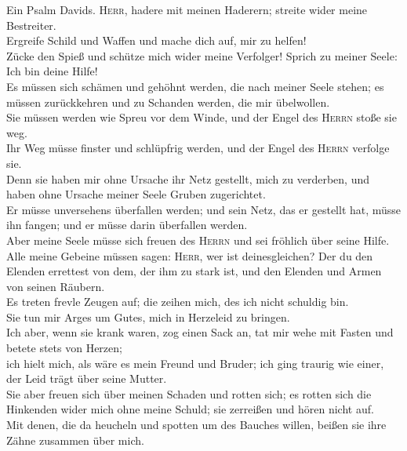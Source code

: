  Ein Psalm Davids. \textsc{Herr}, hadere mit meinen
Haderern; streite wider meine Bestreiter.\\
 Ergreife Schild und Waffen und mache dich auf, mir zu
helfen!\\
 Zücke den Spieß und schütze mich wider meine Verfolger!
Sprich zu meiner Seele: Ich bin deine Hilfe!\\
 Es müssen sich schämen und gehöhnt werden, die nach
meiner Seele stehen; es müssen zurückkehren und zu Schanden werden, die
mir übelwollen.\\
 Sie müssen werden wie Spreu vor dem Winde, und der Engel
des \textsc{Herrn} stoße sie weg.\\
 Ihr Weg müsse finster und schlüpfrig werden, und der
Engel des \textsc{Herrn} verfolge sie.\\
 Denn sie haben mir ohne Ursache ihr Netz gestellt, mich
zu verderben, und haben ohne Ursache meiner Seele Gruben zugerichtet.\\
 Er müsse unversehens überfallen werden; und sein Netz,
das er gestellt hat, müsse ihn fangen; und er müsse darin überfallen
werden.\\
 Aber meine Seele müsse sich freuen des \textsc{Herrn} und
sei fröhlich über seine Hilfe.\\
 Alle meine Gebeine müssen sagen: \textsc{Herr}, wer ist
deinesgleichen? Der du den Elenden errettest von dem, der ihm zu stark
ist, und den Elenden und Armen von seinen Räubern.\\
 Es treten frevle Zeugen auf; die zeihen mich, des ich
nicht schuldig bin.\\
 Sie tun mir Arges um Gutes, mich in Herzeleid zu
bringen.\\
 Ich aber, wenn sie krank waren, zog einen Sack an, tat
mir wehe mit Fasten und betete stets von Herzen;\\
 ich hielt mich, als wäre es mein Freund und Bruder; ich
ging traurig wie einer, der Leid trägt über seine Mutter.\\
 Sie aber freuen sich über meinen Schaden und rotten
sich; es rotten sich die Hinkenden wider mich ohne meine Schuld; sie
zerreißen und hören nicht auf.\\
 Mit denen, die da heucheln und spotten um des Bauches
willen, beißen sie ihre Zähne zusammen über mich.\\
